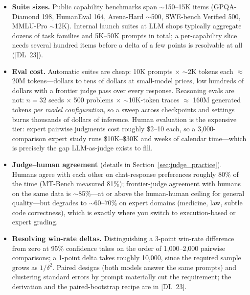 \begin{itemize}
    \item \textbf{Suite sizes.}  Public capability benchmarks span
          $\sim$150--15K items (GPQA-Diamond 198, HumanEval 164, Arena-Hard
          $\sim$500, SWE-bench Verified 500, MMLU-Pro $\sim$12K).  Internal
          launch suites at LLM shops typically aggregate dozens of task
          families and 5K--50K prompts in total; a per-capability slice needs
          several hundred items before a delta of a few points is resolvable
          at all ([DL~23]).
    \item \textbf{Eval cost.}  Automatic suites are cheap: 10K prompts
          $\times$ $\sim$2K tokens each $\approx$ 20M tokens---dollars to tens
          of dollars at small-model prices, low hundreds of dollars with a
          frontier judge pass over every response.  Reasoning evals are not:
          $n=32$ seeds $\times$ 500 problems $\times$ $\sim$10K-token traces
          $\approx$ 160M generated tokens \emph{per model configuration}, so
          a sweep across checkpoints and settings burns thousands of dollars
          of inference.  Human evaluation is the expensive tier: expert
          pairwise judgments cost roughly \$2--10 each, so a 3{,}000-comparison
          expert study runs \$10K--\$30K and weeks of calendar time---which is
          precisely the gap LLM-as-judge exists to fill.
    \item \textbf{Judge--human agreement} (details in
          Section~\ref{sec:judge_practice}).  Humans agree with each other on
          chat-response preferences roughly 80\% of the time (MT-Bench
          measured 81\%); frontier-judge agreement with humans on the same
          data is $\sim$85\%---at or above the human-human ceiling for
          general quality---but degrades to $\sim$60--70\% on expert domains
          (medicine, law, subtle code correctness), which is exactly where
          you switch to execution-based or expert grading.
    \item \textbf{Resolving win-rate deltas.}  Distinguishing a 3-point
          win-rate difference from zero at 95\% confidence takes on the order
          of 1{,}000--2{,}000 pairwise comparisons; a 1-point delta takes
          roughly 10{,}000, since the required sample grows as $1/\delta^2$.
          Paired designs (both models answer the same prompts) and clustering
          standard errors by prompt materially cut the requirement; the
          derivation and the paired-bootstrap recipe are in [DL~23].
\end{itemize}

